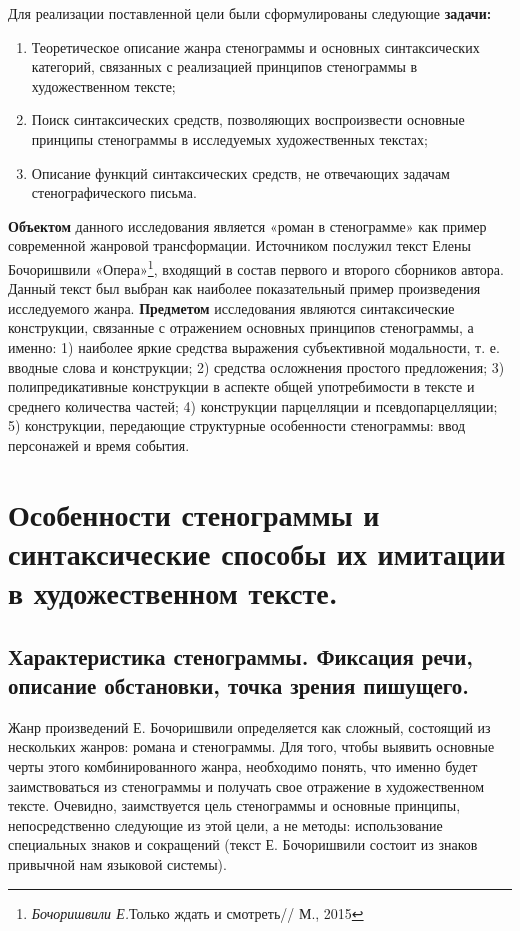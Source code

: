 \documentclass{kursa4}
\begin{document}
    {Для реализации поставленной цели были сформулированы следующие \textbf{задачи:}
    
    \begin{enumerate}
      \item Теоретическое описание жанра стенограммы и
      основных синтаксических категорий, связанных с реализацией принципов
      стенограммы в художественном тексте;
      \item Поиск синтаксических средств, позволяющих
      воспроизвести основные принципы стенограммы в исследуемых
      художественных текстах;
      \item Описание функций синтаксических средств, не
      отвечающих задачам стенографического письма.
    \end{enumerate}

    \textbf{Объектом} данного исследования является «роман в
    стенограмме» как пример современной жанровой трансформации. Источником
    послужил текст Елены Бочоришвили «Опера»\footnote{\textit{Бочоришвили Е.}{Только
    ждать и смотреть// М., 2015}}, входящий в состав первого и второго сборников автора. Данный текст был выбран как наиболее показательный пример произведения исследуемого жанра. 
    \textbf{Предметом} исследования являются синтаксические конструкции, связанные с отражением основных принципов стенограммы, а именно: 1) наиболее яркие средства выражения субъективной модальности, т. е. вводные слова и конструкции; 2) средства осложнения простого предложения; 3)  полипредикативные конструкции в аспекте общей употребимости в тексте и среднего количества частей; 4) конструкции парцелляции и псевдопарцелляции; 5) конструкции, передающие структурные особенности стенограммы: ввод персонажей и время события. 

  \setcounter{chapter}{0}
  \chapter {Особенности стенограммы и
  синтаксические способы их имитации в художественном тексте.}

    \section {Характеристика стенограммы. Фиксация
    речи, описание обстановки, точка зрения пишущего.}

      Жанр произведений Е. Бочоришвили определяется как сложный, состоящий
      из нескольких жанров: романа и стенограммы. Для того, чтобы выявить
      основные черты этого комбинированного жанра, необходимо понять, что
      именно будет заимствоваться из стенограммы и получать свое отражение в
      художественном тексте. Очевидно, заимствуется цель стенограммы и
      основные принципы, непосредственно следующие из этой цели, а не методы:
      использование специальных знаков и сокращений (текст Е. Бочоришвили
      состоит из знаков привычной нам языковой системы). 

}
\end{document}
